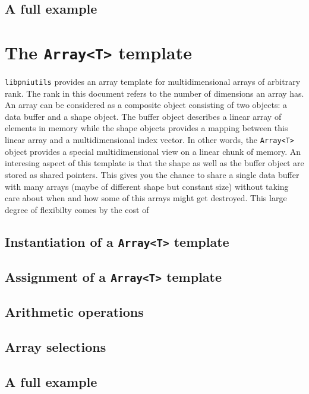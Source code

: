 \subsection{A full example}

\section{The {\tt Array<T>} template}

{\tt libpniutils} provides an array template for multidimensional arrays 
of arbitrary rank. The rank in this document refers to the number of dimensions 
an array has. An array can be considered as a composite object consisting 
of two objects: a data buffer and a shape object. 
The buffer object describes a linear array of elements in memory while the 
shape objects provides a mapping between this linear array and a
multidimensional index vector. 
In other words, the {\tt Array<T>} object provides a special multidimensional 
view on a linear chunk of memory.
An interesing aspect of this template is that the shape as well as the buffer 
object are stored as shared pointers. This gives you the chance to share 
a single data buffer with many arrays (maybe of different shape but constant
size) without taking care about when and how some of this arrays might get
destroyed. This large degree of flexibilty comes by the cost of 

\subsection{Instantiation of a {\tt Array<T>} template}



\subsection{Assignment of a {\tt Array<T>} template}

\subsection{Arithmetic operations}

\subsection{Array selections}

\subsection{A full example}